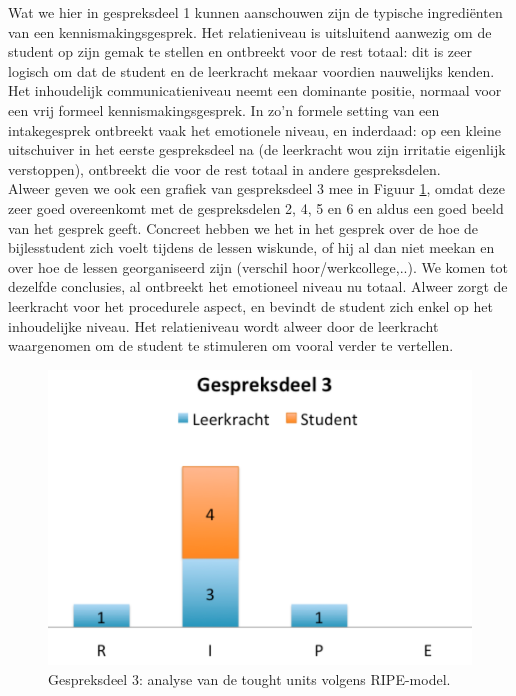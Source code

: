 \documentclass[a4paper,12pt]{article}
\theoremstyle{definition}
\begin{document}
Wat we hier in gespreksdeel 1 kunnen aanschouwen zijn
de typische ingrediënten van een kennismakingsgesprek.  Het relatieniveau is 
uitsluitend aanwezig om de student op zijn gemak te stellen en ontbreekt voor de 
rest totaal: dit is zeer logisch om dat de student en de leerkracht mekaar 
voordien nauwelijks kenden. Het inhoudelijk communicatieniveau neemt een dominante positie, normaal voor een vrij formeel kennismakingsgesprek. In zo'n formele 
setting van een intakegesprek ontbreekt vaak het emotionele niveau, en 
inderdaad: op een kleine uitschuiver in het eerste gespreksdeel na (de leerkracht wou zijn irritatie eigenlijk 
verstoppen), ontbreekt die voor de rest totaal in andere gespreksdelen. \\

Alweer geven we ook een grafiek van gespreksdeel 3 mee in Figuur \ref{6}, omdat deze zeer goed 
overeenkomt met de gespreksdelen 2, 4, 5 en 6 en aldus een goed beeld van het 
gesprek geeft. Concreet hebben we het in het gesprek over de hoe de bijlesstudent zich voelt tijdens de lessen wiskunde, of hij al dan niet meekan en over hoe de lessen georganiseerd zijn (verschil hoor/werkcollege,..). 
We komen tot dezelfde conclusies, al ontbreekt het emotioneel niveau nu totaal. 
Alweer zorgt de leerkracht voor het procedurele aspect, en bevindt de student zich enkel op 
het inhoudelijke niveau. Het relatieniveau wordt alweer door de leerkracht 
waargenomen om de student te stimuleren om vooral verder te vertellen.\\

\begin{figure}
  \centering
  \includegraphics[scale=0.6]{grafiek6.png}\caption{Gespreksdeel 3: analyse van 
de tought units volgens RIPE-model.}\label{6}
\end{figure}
\end{document}
